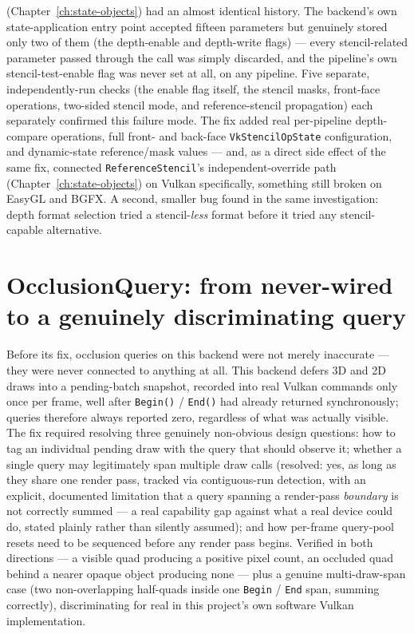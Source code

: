  (Chapter~\ref{ch:state-objects}) had an almost identical
history. The backend's own state-application entry point accepted fifteen parameters but
genuinely stored only two of them (the depth-enable and depth-write flags) --- every
stencil-related parameter passed through the call was simply discarded, and the pipeline's
own stencil-test-enable flag was never set at all, on any pipeline. Five separate,
independently-run checks (the enable flag itself, the stencil masks, front-face operations,
two-sided stencil mode, and reference-stencil propagation) each separately confirmed this
failure mode. The fix added real per-pipeline depth-compare operations, full front- and
back-face \texttt{VkStencilOpState} configuration, and dynamic-state reference/mask values ---
and, as a direct side effect of the same fix, connected \texttt{ReferenceStencil}'s
independent-override path (Chapter~\ref{ch:state-objects}) on Vulkan specifically, something
still broken on EasyGL and BGFX. A second, smaller bug found in the same investigation: depth
format selection tried a stencil-\emph{less} format before it tried any stencil-capable
alternative.

\section{OcclusionQuery: from never-wired to a genuinely discriminating query}

Before its fix, occlusion queries on this backend were not merely inaccurate --- they were
never connected to anything at all. This backend defers 3D and 2D draws into a pending-batch
snapshot, recorded into real Vulkan commands only once per frame, well after
\texttt{Begin()} / \texttt{End()} had already returned synchronously; queries therefore always
reported zero, regardless of what was actually visible. The fix required resolving three
genuinely non-obvious design questions: how to tag an individual pending draw with the query
that should observe it; whether a single query may legitimately span multiple draw calls
(resolved: yes, as long as they share one render pass, tracked via contiguous-run detection,
with an explicit, documented limitation that a query spanning a render-pass \emph{boundary}
is not correctly summed --- a real capability gap against what a real device could do, stated
plainly rather than silently assumed); and how per-frame query-pool resets need to be
sequenced before any render pass begins. Verified in both directions --- a visible quad
producing a positive pixel count, an occluded quad behind a nearer opaque object producing
none --- plus a genuine multi-draw-span case (two non-overlapping half-quads inside one
\texttt{Begin} / \texttt{End} span, summing correctly), discriminating for real in this
project's own software Vulkan implementation.

